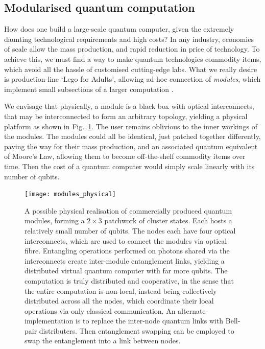 %
%

\subsection{Modularised quantum computation} \label{sec:module} 

How does one build a large-scale quantum computer, given the extremely daunting technological requirements and high costs? In any industry, economies of scale allow the mass production, and rapid reduction in price of technology. To achieve this, we must find a way to make quantum technologies commodity items, which avoid all the hassle of customised cutting-edge labs. What we really desire is production-line `Lego for Adults{\texttrademark}', allowing ad hoc connection of \textit{modules}, which implement small subsections of a larger computation \cite{bib:FowlerPrivate}.

We envisage that physically, a module is a black box with optical interconnects, that may be interconnected to form an arbitrary topology, yielding a physical platform as shown in Fig.~\ref{fig:modules_physical}. The user remains oblivious to the inner workings of the modules. The modules could all be identical, just patched together differently, paving the way for their mass production, and an associated quantum equivalent of Moore's Law, allowing them to become off-the-shelf commodity items over time. Then the cost of a quantum computer would simply scale linearly with its number of qubits.

\begin{figure}[!htbp]
	\texttt{[image: modules\_physical]}
	\captionspacefig \caption{A possible physical realisation of commercially produced quantum modules, forming a \mbox{$2\times 3$} patchwork of cluster states. Each hosts a relatively small number of qubits. The nodes each have four optical interconnects, which are used to connect the modules via optical fibre. Entangling operations performed on photons shared via the interconnects create inter-module entanglement links, yielding a distributed virtual quantum computer with far more qubits. The computation is truly distributed and cooperative, in the sense that the entire computation is non-local, instead being collectively distributed across all the nodes, which coordinate their local operations via only classical communication. An alternate implementation is to replace the inter-node quantum links with Bell-pair distributers. Then entanglement swapping can be employed to swap the entanglement into a link between nodes.}\label{fig:modules_physical}
\end{figure}


